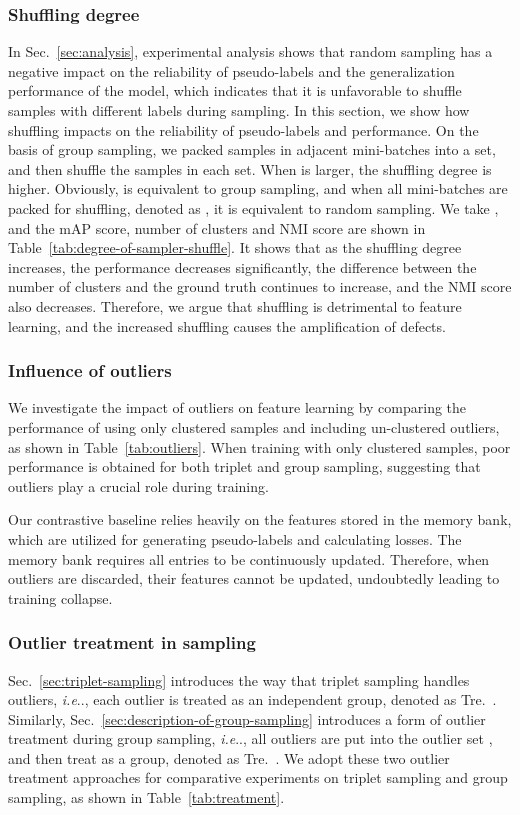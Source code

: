 \documentclass[lettersize,journal]{IEEEtran}
\makeatletter
\DeclareRobustCommand\onedot{\futurelet\@let@token\@onedot}
\def\@onedot{\ifx\@let@token.\else.\null\fi\xspace}
\def\ie{\emph{i.e}\onedot} \def\Ie{\emph{I.e}\onedot}
\makeatother
\begin{document}
\subsubsection{Shuffling degree}
In Sec.~\ref{sec:analysis}, experimental analysis shows that random sampling has a negative impact on the reliability of pseudo-labels and the generalization performance of the model, which indicates that it is unfavorable to shuffle samples with different labels during sampling. In this section, we show how shuffling impacts on the reliability of pseudo-labels and performance. On the basis of group sampling, we packed samples in adjacent  mini-batches into a set, and then shuffle the samples in each set. When  is larger, the shuffling degree is higher. Obviously,  is equivalent to group sampling, and when all mini-batches are packed for shuffling, denoted as , it is equivalent to random sampling. We take , and the mAP score, number of clusters and NMI score are shown in Table~\ref{tab:degree-of-sampler-shuffle}. 
It shows that as the shuffling degree increases, the performance decreases significantly, the difference between the number of clusters and the ground truth continues to increase, and the NMI score also decreases. Therefore, we argue that shuffling is detrimental to feature learning, and the increased shuffling causes the amplification of defects.

\subsubsection{Influence of outliers} \label{sec:influence-outliers}
We investigate the impact of outliers on feature learning by comparing the performance of using only clustered samples and including un-clustered outliers, as shown in Table~\ref{tab:outliers}.
When training with only clustered samples, poor performance is obtained for both triplet and group sampling, suggesting that outliers play a crucial role during training.

Our contrastive baseline relies heavily on the features stored in the memory bank, which are utilized for generating pseudo-labels and calculating losses. The memory bank requires all entries to be continuously updated. Therefore, when outliers are discarded, their features cannot be updated, undoubtedly leading to training collapse.

\subsubsection{Outlier treatment in sampling}
\label{sec:treatment-of-outliers}
Sec.~\ref{sec:triplet-sampling} introduces the way that triplet sampling handles outliers, \ie, each outlier is treated as an independent group, denoted as Tre.~\uppercase\expandafter{}.
Similarly, Sec.~\ref{sec:description-of-group-sampling} introduces a form of outlier treatment during group sampling, \ie, all outliers are put into the outlier set , and then treat  as a group, denoted as Tre.~\uppercase\expandafter{}.
We adopt these two outlier treatment approaches for comparative experiments on triplet sampling and group sampling, as shown in Table~\ref{tab:treatment}. 
\end{document}
